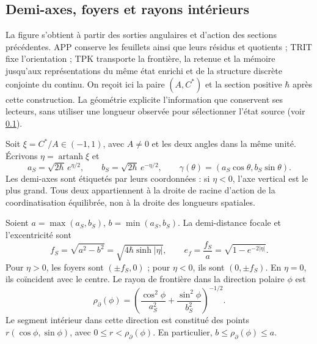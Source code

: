 
\subsection{Demi-axes, foyers et rayons intérieurs}
\label{sec:ii-elipse-geometria}

La figure s’obtient à partir des sorties angulaires et d’action des sections
précédentes. APP conserve les feuillets ainsi que leurs résidus et quotients ; TRIT fixe
l’orientation ; TPK transporte la frontière, la retenue et la mémoire jusqu’aux
représentations du même état enrichi et de la structure discrète
conjointe du continu. On reçoit ici la paire \((A,C^*)\) et la section
positive \(\hbar\) après cette construction. La géométrie explicite
l’information que conservent ses lecteurs, sans utiliser une longueur observée
pour sélectionner l’état source (voir \ref{sec:ii-elipse-geometria}).

Soit \(\xi=C^*/A\in(-1,1)\), avec \(A\ne0\) et les deux angles dans la
même unité. Écrivons \(\eta=\operatorname{artanh}\xi\) et
\[
 a_S=\sqrt{2\hbar}\,e^{\eta/2},\qquad
 b_S=\sqrt{2\hbar}\,e^{-\eta/2},\qquad
 \gamma(\theta)=(a_S\cos\theta,b_S\sin\theta).
\]
Les demi-axes sont étiquetés par leurs coordonnées : si \(\eta<0\),
l’axe vertical est le plus grand. Tous deux appartiennent à la droite de racine
d’action de la coordinatisation équilibrée, non à la droite des longueurs spatiales.

\begin{proposition}
\label{prop:ii-elipse-focos}
Soient \(a=\max(a_S,b_S)\), \(b=\min(a_S,b_S)\). La demi-distance
focale et l'excentricité sont
\begin{equation}
 f_S=\sqrt{a^2-b^2}
 =\sqrt{4\hbar\sinh|\eta|},\qquad
 e_f=\frac{f_S}{a}=\sqrt{1-e^{-2|\eta|}}.
 \label{eq:ii-elipse-focal}
\end{equation}
Pour \(\eta>0\), les foyers sont \((\pm f_S,0)\) ; pour
\(\eta<0\), ils sont \((0,\pm f_S)\). En \(\eta=0\), ils coïncident avec
le centre. Le rayon de frontière dans la direction polaire \(\phi\) est
\begin{equation}
 \rho_{\partial}(\phi)
 =\left(\frac{\cos^2\phi}{a_S^2}
        +\frac{\sin^2\phi}{b_S^2}\right)^{-1/2}.
 \label{eq:ii-elipse-radio-polar}
\end{equation}
Le segment intérieur dans cette direction est constitué des points
\(r(\cos\phi,\sin\phi)\), avec \(0\le r<\rho_{\partial}(\phi)\).
En particulier, \(b\le\rho_{\partial}(\phi)\le a\).
\end{proposition}

